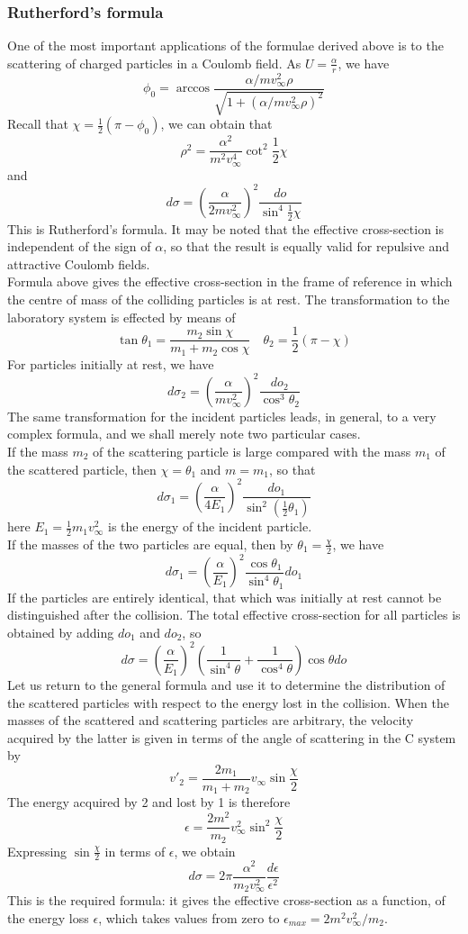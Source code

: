 \documentclass[cyan]{elegantnote}
\begin{document}
\subsubsection{Rutherford's formula}
One of the most important applications of the formulae derived above is to the scattering of charged particles in a Coulomb field. As $U = \frac{\alpha}{r}$, we have
\[\phi_0 = \arccos \frac{\alpha/mv^2_{\infty}\rho}{\sqrt{1+(\alpha/mv^2_{\infty}\rho)^2}}\]
Recall that $\chi = \frac{1}{2}(\pi-\phi_0)$, we can obtain that
\[\rho^2 = \frac{\alpha^2}{m^2v_{\infty}^4} \cot^2 \frac{1}{2}\chi\]
and
\[d\sigma = \left( \frac{\alpha}{2mv_{\infty}^2} \right)^2 \frac{do}{\sin^4 \frac{1}{2}\chi}\]
This is Rutherford's formula. It may be noted that the effective cross-section is independent of the sign of $\alpha$, so that the result is equally valid for repulsive
and attractive Coulomb fields.\\
Formula above gives the effective cross-section in the frame of reference in which the centre of mass of the colliding particles is at rest. The transformation to the laboratory system is effected by means of
\[\tan\theta_1 = \frac{m_2\sin\chi}{m_1 + m_2 \cos\chi} \quad \theta_2 = \frac{1}{2}(\pi - \chi)\]
For particles initially at rest, we have
\[d\sigma_2 = \left ( \frac{\alpha}{mv^2_{\infty}} \right )^2 \frac{do_2}{\cos^3 \theta_2}\]
The same transformation for the incident particles leads, in general, to a very complex formula, and we shall merely note two particular cases.\\
If the mass $m_2$ of the scattering particle is large compared with the mass $m_1$ of the scattered particle, then $\chi = \theta_1$ and $m = m_1$, so that
\[d\sigma_1 = \left ( \frac{\alpha}{4E_1}\right )^2 \frac{do_1}{\sin^2 (\frac{1}{2}\theta_1)}\]
here $E_1 = \frac{1}{2}m_1v^2_{\infty}$ is the energy of the incident particle.\\
If the masses of the two particles are equal, then by $\theta_1 = \frac{\chi}{2}$, we have
\[d\sigma_1 =  \left ( \frac{\alpha}{E_1}\right )^2 \frac{\cos\theta_1}{\sin^4\theta_1} do_1\]
If the particles are entirely identical, that which was initially at rest cannot be distinguished after the collision. The total effective cross-section for all
particles is obtained by adding $do_1$ and $do_2$, so
\[d\sigma = \left ( \frac{\alpha}{E_1}\right )^2 \left ( \frac{1}{\sin^4\theta} + \frac{1}{\cos^4\theta} \right )\cos\theta do\]
Let us return to the general formula and use it to determine the distribution of the scattered particles with respect to the energy lost in the collision. 
When the masses of the scattered and scattering particles are arbitrary, the velocity acquired by the latter is given in terms of the angle of scattering in the C system by
\[v'_2 = \frac{2m_1}{m_1+m_2} v_{\infty} \sin \frac{\chi}{2}\]
The energy acquired by 2 and lost by 1 is therefore
\[\epsilon = \frac{2m^2}{m_2} v_{\infty}^2 \sin^2 \frac{\chi}{2} \]
Expressing $\sin \frac{\chi}{2}$ in terms of $\epsilon$, we obtain
\[d\sigma = 2\pi \frac{\alpha^2}{m_2 v^2_{\infty}} \frac{d\epsilon}{\epsilon^2}\]
This is the required formula: it gives the effective cross-section as a function, of the energy loss $\epsilon$, which takes values from zero to $\epsilon_{max} = 2m^2 v_{\infty}^2 /m_2$.
\end{document}
